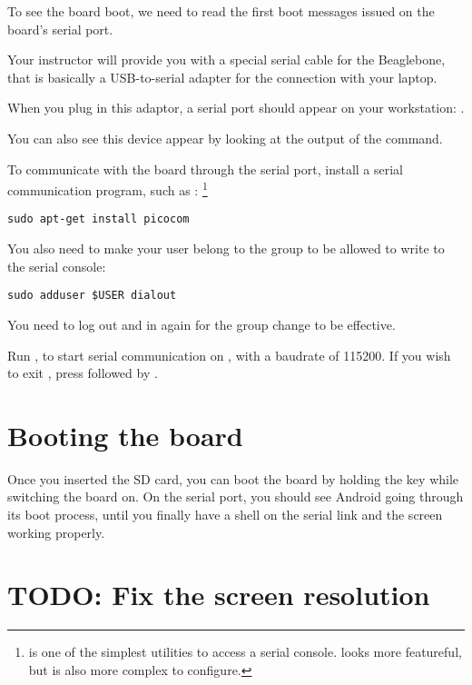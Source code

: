 To see the board boot, we need to read the first boot messages issued
on the board's serial port.

Your instructor will provide you with a special serial cable for the
Beaglebone, that is basically a USB-to-serial adapter for the
connection with your laptop.

When you plug in this adaptor, a serial port should appear on your
workstation: .

You can also see this device appear by looking at the output of the
 command.

To communicate with the board through the serial port, install a
serial communication program, such as :
\footnote{ is one of the simplest utilities to access a
  serial console.  looks more featureful, but is also
  more complex to configure.}

\begin{verbatim}
sudo apt-get install picocom
\end{verbatim}

You also need to make your user belong to the  group to be
allowed to write to the serial console:

\begin{verbatim}
sudo adduser $USER dialout
\end{verbatim}

You need to log out and in again for the group change to be effective.

Run , to start serial
communication on , with a baudrate of 115200. If
you wish to exit , press \code{[Ctrl][a]} followed by
\code{[Ctrl][x]}.

\section{Booting the board}

Once you inserted the SD card, you can boot the board by holding the
 key while switching the board on. On the serial port, you
should see Android going through its boot process, until you finally
have a shell on the serial link and the screen working properly.

\section{TODO: Fix the screen resolution}